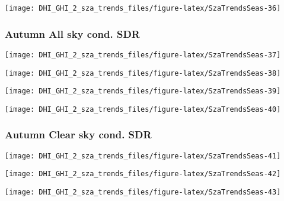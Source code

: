 \documentclass[
  10pt,
  a4paper,oneside]{article}
\begin{document}
\begin{center}\texttt{[image: DHI\_GHI\_2\_sza\_trends\_files/figure-latex/SzaTrendsSeas-36]} \end{center}

\newpage

\hypertarget{autumn-all-sky-cond.-sdr}{%
\subsubsection{Autumn All sky cond. SDR}\label{autumn-all-sky-cond.-sdr}}

\begin{center}\texttt{[image: DHI\_GHI\_2\_sza\_trends\_files/figure-latex/SzaTrendsSeas-37]} \end{center}

\begin{center}\texttt{[image: DHI\_GHI\_2\_sza\_trends\_files/figure-latex/SzaTrendsSeas-38]} \end{center}

\begin{center}\texttt{[image: DHI\_GHI\_2\_sza\_trends\_files/figure-latex/SzaTrendsSeas-39]} \end{center}

\begin{center}\texttt{[image: DHI\_GHI\_2\_sza\_trends\_files/figure-latex/SzaTrendsSeas-40]} \end{center}

\newpage

\hypertarget{autumn-clear-sky-cond.-sdr}{%
\subsubsection{Autumn Clear sky cond. SDR}\label{autumn-clear-sky-cond.-sdr}}

\begin{center}\texttt{[image: DHI\_GHI\_2\_sza\_trends\_files/figure-latex/SzaTrendsSeas-41]} \end{center}

\begin{center}\texttt{[image: DHI\_GHI\_2\_sza\_trends\_files/figure-latex/SzaTrendsSeas-42]} \end{center}

\begin{center}\texttt{[image: DHI\_GHI\_2\_sza\_trends\_files/figure-latex/SzaTrendsSeas-43]} \end{center}
\end{document}
